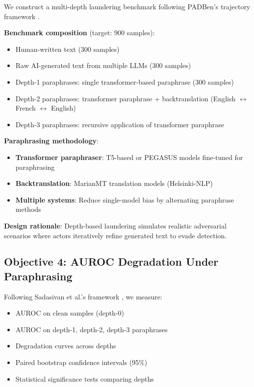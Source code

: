 \documentclass[conference]{IEEEtran}
\begin{document}
We construct a multi-depth laundering benchmark following PADBen's trajectory framework \cite{zha2024padben}.

\textbf{Benchmark composition} (target: 900 samples):
\begin{itemize}
    \item Human-written text (300 samples)
    \item Raw AI-generated text from multiple LLMs (300 samples)
    \item Depth-1 paraphrases: single transformer-based paraphrase (300 samples)
    \item Depth-2 paraphrases: transformer paraphrase + backtranslation (English $\leftrightarrow$ French $\leftrightarrow$ English)
    \item Depth-3 paraphrases: recursive application of transformer paraphrase
\end{itemize}

\textbf{Paraphrasing methodology}:
\begin{itemize}
    \item \textbf{Transformer paraphraser}: T5-based or PEGASUS models fine-tuned for paraphrasing
    \item \textbf{Backtranslation}: MarianMT translation models (Helsinki-NLP)
    \item \textbf{Multiple systems}: Reduce single-model bias by alternating paraphrase methods
\end{itemize}

\textbf{Design rationale}: Depth-based laundering simulates realistic adversarial scenarios where actors iteratively refine generated text to evade detection.

\subsection{Objective 4: AUROC Degradation Under Paraphrasing}

Following Sadasivan et al.'s framework \cite{sadasivan2023can}, we measure:

\begin{itemize}
    \item AUROC on clean samples (depth-0)
    \item AUROC on depth-1, depth-2, depth-3 paraphrases
    \item Degradation curves across depths
    \item Paired bootstrap confidence intervals (95\%)
    \item Statistical significance tests comparing depths
\end{itemize}
\end{document}
